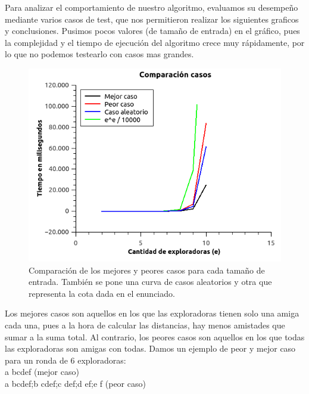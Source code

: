 \begin{itemize}
Para analizar el comportamiento de nuestro algoritmo, evaluamos su desempeño mediante varios casos de test, que nos permitieron realizar los siguientes graficos y conclusiones. Pusimos pocos valores (de tamaño de entrada) en el gráfico, pues la complejidad y el tiempo de ejecución del algoritmo crece muy rápidamente, por lo que no podemos testearlo con casos mas grandes. 

\begin{figure}[H] 
\begin{center}

  \includegraphics[width=\linewidth]{../graficos/ej3/ComparacionCasos.png}
  \caption{{\small Comparación de los mejores y peores casos para cada tamaño de entrada. También se pone una curva de casos aleatorios y otra que representa la cota dada en el enunciado.}} \label{asd}
\endminipage

\end{center}
\end{figure} 

Los mejores casos son aquellos en los que las exploradoras tienen solo una amiga cada una, pues a la hora de calcular las distancias, hay menos amistades que sumar a la suma total. Al contrario, los peores casos son aquellos en los que todas las exploradoras son amigas con todas. Damos un ejemplo de peor y mejor caso para un ronda de 6 exploradoras: \\
a bcdef (mejor caso) \\
a bcdef;b cdef;c def;d ef;e f (peor caso) \\



\end{itemize}

